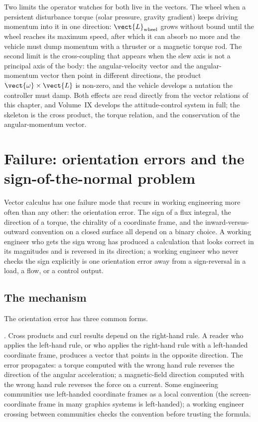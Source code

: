 Two limits the operator watches for both live in the vectors. The
wheel  when a persistent disturbance torque (solar
pressure, gravity gradient) keeps driving momentum into it in one
direction: $\vect{L}_{\text{wheel}}$ grows without bound until the
wheel reaches its maximum speed, after which it can absorb no more and
the vehicle must dump momentum with a thruster or a magnetic torque
rod. The second limit is the cross-coupling that appears when the slew
axis is not a principal axis of the body: the angular-velocity vector
and the angular-momentum vector then point in different directions, the
product $\vect{\omega}\times\vect{L}$ is non-zero, and the vehicle
develops a nutation the controller must damp. Both effects are read
directly from the vector relations of this chapter, and Volume~IX
develops the attitude-control system in full; the skeleton is the
cross product, the torque relation, and the conservation of the
angular-momentum vector.

\section{Failure: orientation errors and the sign-of-the-normal
problem}

Vector calculus has one failure mode that recurs in working
engineering more often than any other: the orientation error. The
sign of a flux integral, the direction of a torque, the chirality of
a coordinate frame, and the inward-versus-outward convention on a
closed surface all depend on a binary choice. A working engineer who
gets the sign wrong has produced a calculation that looks correct in
its magnitudes and is reversed in its direction; a working engineer
who never checks the sign explicitly is one orientation error away
from a sign-reversal in a load, a flow, or a control output.

\subsection{The mechanism}

The orientation error has three common forms.

. Cross products and curl results depend
on the right-hand rule. A reader who applies the left-hand rule, or
who applies the right-hand rule with a left-handed coordinate frame,
produces a vector that points in the opposite direction. The error
propagates: a torque computed with the wrong hand rule reverses the
direction of the angular acceleration; a magnetic-field direction
computed with the wrong hand rule reverses the force on a current.
Some engineering communities use left-handed coordinate frames as a
local convention (the screen-coordinate frame in many graphics
systems is left-handed); a working engineer crossing between
communities checks the convention before trusting the formula.

